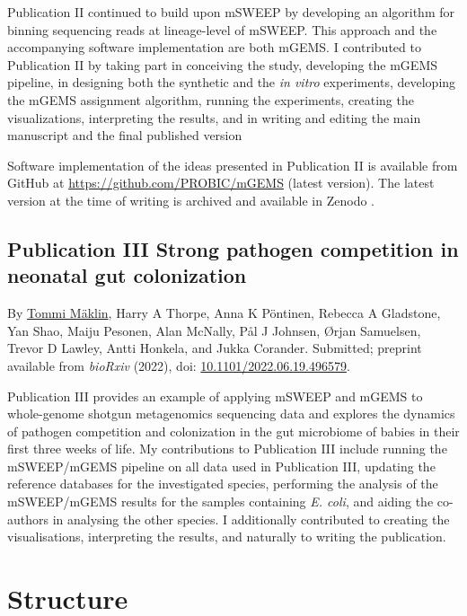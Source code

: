 \documentclass[officiallayout]{tktla}
\begin{document}
Publication II \citep{maklin_bacterial_2021} continued to build upon
mSWEEP by developing an algorithm for binning sequencing reads at
lineage-level of mSWEEP. This approach and the accompanying software
implementation are both mGEMS. I contributed to Publication II by
taking part in conceiving the study, developing the mGEMS pipeline, in
designing both the synthetic and the \textit{in vitro} experiments,
developing the mGEMS assignment algorithm, running the experiments,
creating the visualizations, interpreting the results, and in writing
and editing the main manuscript and the final published version

Software implementation of the ideas presented in Publication II is
available from GitHub at
\href{https://github.com/PROBIC/mGEMS}{https://github.com/PROBIC/mGEMS} (latest version).
The latest version at the time of writing is archived and available in
Zenodo \citep{maklin_mGEMS}.

\subsection*{Publication III \textemdash{ } Strong pathogen competition in neonatal gut colonization}
By \underline{Tommi M\"aklin}, Harry A Thorpe, Anna K P\"ontinen, Rebecca
A Gladstone, Yan Shao, Maiju Pesonen, Alan McNally, P\aa l J Johnsen,
\O rjan Samuelsen, Trevor D Lawley, Antti Honkela, and Jukka
Corander. Submitted; preprint available from \textit{bioRxiv} (2022),
doi: \href{https://doi.org/10.1101/2022.06.19.496579}{10.1101/2022.06.19.496579}.

Publication III \citep{maklin_strong_2022} provides an example of
applying mSWEEP and mGEMS to whole-genome shotgun metagenomics
sequencing data and explores the dynamics of pathogen competition and
colonization in the gut microbiome of babies in their first three
weeks of life. My contributions to Publication III include running the
mSWEEP/mGEMS pipeline on all data used in Publication III, updating the
reference databases for the investigated species, performing the
analysis of the mSWEEP/mGEMS results for the samples containing
\textit{E. coli}, and aiding the co-authors in analysing the other
species. I additionally contributed to creating the visualisations,
interpreting the results, and naturally to writing the publication.

\section{Structure}
\end{document}
